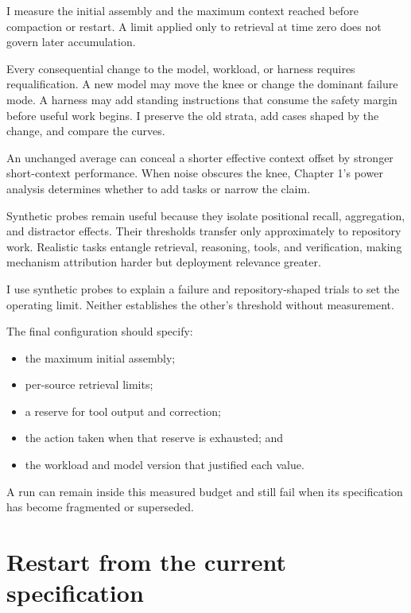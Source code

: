 I measure the initial assembly and the maximum context reached before compaction or restart. A limit applied only to retrieval at time zero does not govern later accumulation.

Every consequential change to the model, workload, or harness requires requalification. A new model may move the knee or change the dominant failure mode. A harness may add standing instructions that consume the safety margin before useful work begins. I preserve the old strata, add cases shaped by the change, and compare the curves.

An unchanged average can conceal a shorter effective context offset by stronger short-context performance. When noise obscures the knee, Chapter 1's power analysis determines whether to add tasks or narrow the claim.

Synthetic probes remain useful because they isolate positional recall, aggregation, and distractor effects. Their thresholds transfer only approximately to repository work. Realistic tasks entangle retrieval, reasoning, tools, and verification, making mechanism attribution harder but deployment relevance greater.

I use synthetic probes to explain a failure and repository-shaped trials to set the operating limit. Neither establishes the other's threshold without measurement.


The final configuration should specify:

\begin{itemize}
\tightlist
\item
  the maximum initial assembly;
\item
  per-source retrieval limits;
\item
  a reserve for tool output and correction;
\item
  the action taken when that reserve is exhausted; and
\item
  the workload and model version that justified each value.
\end{itemize}

A run can remain inside this measured budget and still fail when its specification has become fragmented or superseded.

\hypertarget{restart-from-the-current-specification}{%
\section{Restart from the current specification}\label{restart-from-the-current-specification}}

